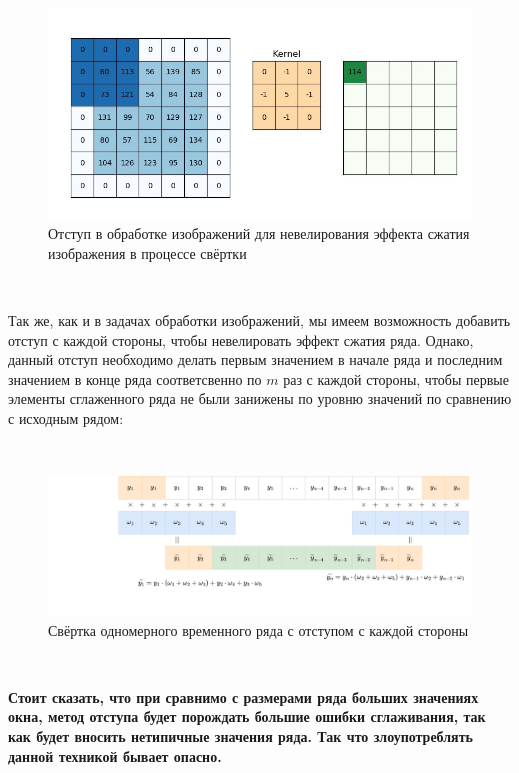 \documentclass[
]{article}
\begin{document}
\(\ \)

\begin{figure}
\centering
\includegraphics{padding_conv2d.jpeg}
\caption{Отступ в обработке изображений для невелирования эффекта сжатия
изображения в процессе свёртки}
\end{figure}

\(\ \)

Так же, как и в задачах обработки изображений, мы имеем возможность
добавить отступ с каждой стороны, чтобы невелировать эффект сжатия ряда.
Однако, данный отступ необходимо делать первым значением в начале ряда и
последним значением в конце ряда соответсвенно по \(m\) раз с каждой
стороны, чтобы первые элементы сглаженного ряда не были занижены по
уровню значений по сравнению с исходным рядом:

\(\ \)

\begin{figure}
\centering
\includegraphics{Statistics-Свертка3.drawio.png}
\caption{Свёртка одномерного временного ряда с отступом с каждой
стороны}
\end{figure}

\(\ \)

\textbf{Стоит сказать, что при сравнимо с размерами ряда больших
значениях окна, метод отступа будет порождать большие ошибки
сглаживания, так как будет вносить нетипичные значения ряда. Так что
злоупотреблять данной техникой бывает опасно.}
\end{document}
